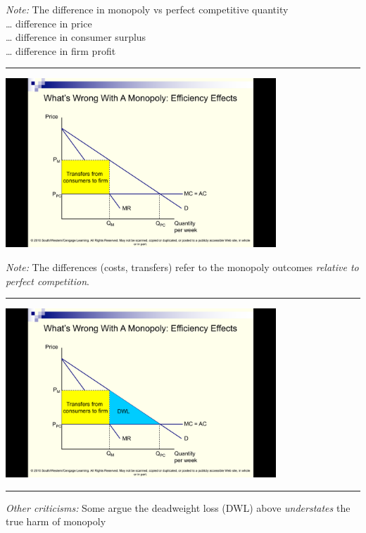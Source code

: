 \documentclass[]{article}
\begin{document}
\emph{Note:}
The difference in monopoly vs perfect competitive quantity\\
\ldots{} difference in price\\
\ldots{} difference in consumer surplus\\
\ldots{} difference in firm profit

\begin{center}\rule{0.5\linewidth}{\linethickness}\end{center}

\includegraphics[height=2.5in]{picsfigs/dwl2.png}

\emph{Note:} The differences (costs, transfers) refer to the monopoly outcomes \emph{relative to perfect competition}.

\begin{center}\rule{0.5\linewidth}{\linethickness}\end{center}

\includegraphics[height=2.5in]{picsfigs/dwl3.png}

\begin{center}\rule{0.5\linewidth}{\linethickness}\end{center}

\emph{Other criticisms:} Some argue the deadweight loss (DWL) above \emph{understates} the true harm of monopoly
\end{document}
